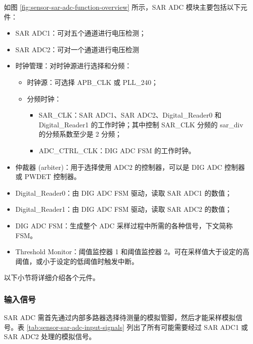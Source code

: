 \documentclass[main\_\_CN.tex]{subfiles}
\begin{document}
如图 \ref{fig:sensor-sar-adc-function-overview} 所示，SAR ADC 模块主要包括以下元件：

\begin{itemize}
    \item SAR ADC1：可对五个通道进行电压检测；
    \item SAR ADC2：可对一个通道进行电压检测 
    \item 时钟管理：对时钟源进行选择和分频：
        \begin{itemize}
            \item 时钟源：可选择 APB\_CLK 或 PLL\_240；
            \item 分频时钟：
             \begin{itemize}
                 \item SAR\_CLK：SAR ADC1、SAR ADC2、Digital\_Reader0 和 Digital\_Reader1 的工作时钟；其中控制 SAR\_CLK 分频的 sar\_div 的分频系数至少是 2 分频；
                 \item ADC\_CTRL\_CLK：DIG ADC FSM 的工作时钟。
             \end{itemize}
        \end{itemize}
    \item 仲裁器 (arbiter)：用于选择使用 ADC2 的控制器，可以是 DIG ADC 控制器或 PWDET 控制器。
    \item \label{other:sensor-item-read-data-from-sar-adc1} Digital\_Reader0：由 DIG ADC FSM 驱动，读取 SAR ADC1 的数值；
    \item Digital\_Reader1：由 DIG ADC FSM 驱动，读取 SAR ADC2 的数值；
    \item DIG ADC FSM：生成整个 ADC 采样过程中所需的各种信号，下文简称 FSM。
    \item Threshold Monitor：阈值监控器 1 和阈值监控器 2。可在采样值大于设定的高阈值，或小于设定的低阈值时触发中断。
\end{itemize}
以下小节将详细介绍各个元件。

\subsubsection{输入信号}

SAR ADC 需首先通过内部多路器选择待测量的模拟管脚，然后才能采样模拟信号。表 \ref{tab:sensor-sar-adc-input-signals} 列出了所有可能需要经过 SAR ADC1 或 SAR ADC2 处理的模拟信号。
\end{document}
